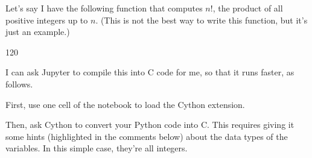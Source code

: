 \documentclass[letterpaper,10pt,english]{sphinxmanual}
\begin{document}
Let’s say I have the following function that computes \(n!\), the product of all positive integers up to \(n\).  (This is not the best way to write this function, but it’s just an example.)

\begin{sphinxVerbatim}[commandchars=\\\{\}]
    
      
          
          
     

  
\end{sphinxVerbatim}

\begin{sphinxVerbatim}[commandchars=\\\{\}]
120
\end{sphinxVerbatim}

I can ask Jupyter to compile this into C code for me, so that it runs faster, as follows.

First, use one cell of the notebook to load the Cython extension.

\begin{sphinxVerbatim}[commandchars=\\\{\}]
 
\end{sphinxVerbatim}

Then, ask Cython to convert your Python code into C.  This requires giving it some hints (highlighted in the comments below) about the data types of the variables.  In this simple case, they’re all integers.

\begin{sphinxVerbatim}[commandchars=\\\{\}]
 
        
            
      
          
          
     
\end{sphinxVerbatim}
\end{document}
